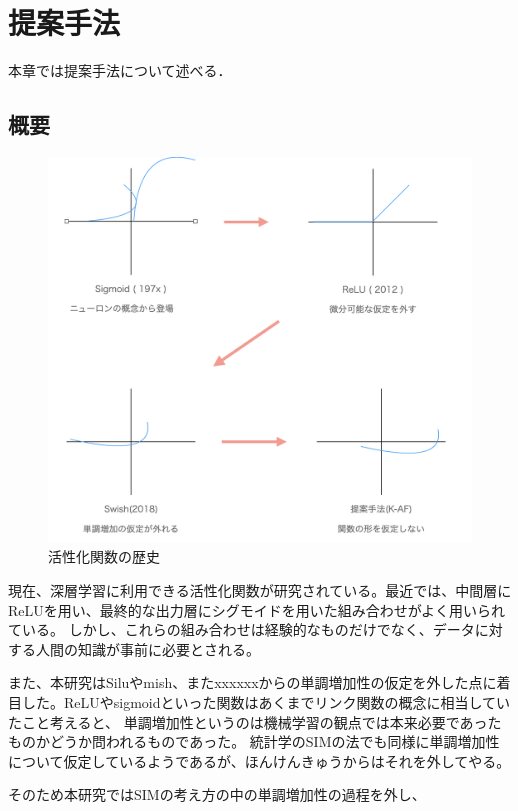 \chapter{提案手法}
\label{proposed}

本章では提案手法について述べる．

\section{概要}


\begin{figure}[hbtp]
\includegraphics[width=15cm]{asset/history_af.png}
	\caption{活性化関数の歴史}
	\label{history_af}
\end{figure}

現在、深層学習に利用できる活性化関数が研究されている。最近では、中間層にReLUを用い、最終的な出力層にシグモイドを用いた組み合わせがよく用いられている。
しかし、これらの組み合わせは経験的なものだけでなく、データに対する人間の知識が事前に必要とされる。


また、本研究はSiluやmish、またxxxxxxからの単調増加性の仮定を外した点に着目した。ReLUやsigmoidといった関数はあくまでリンク関数の概念に相当していたこと考えると、
単調増加性というのは機械学習の観点では本来必要であったものかどうか問われるものであった。
統計学のSIMの法でも同様に単調増加性について仮定しているようであるが、ほんけんきゅうからはそれを外してやる。

そのため本研究ではSIMの考え方の中の単調増加性の過程を外し、

